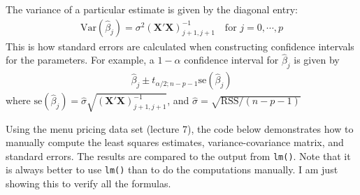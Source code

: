 \documentclass[11pt, fleqn]{article}\usepackage[]{graphicx}\usepackage[]{color}
\newcommand{\Var}{\textrm{Var}}
\newcommand{\se}{\textrm{se}}
\begin{document}
The variance of a particular estimate is given by the diagonal entry:
\begin{align*}
\Var(\hat{\beta}_{j}) = \sigma^2 (\bm{X'X})^{-1}_{j+1, j+1} 
\quad \text{for } j=0,\cdots,p
\end{align*}
This is how standard errors are calculated when constructing confidence intervals for the parameters.  For example, a $1-\alpha$ confidence interval for $\hat{\beta}_j$ is given by
\begin{align*}
\hat{\beta}_j \pm t_{\alpha /2; n-p-1} \se(\hat{\beta}_j)
\end{align*}
where $\se(\hat{\beta}_j) = \hat{\sigma} \sqrt{(\bm{X'X})^{-1}_{j+1,j+1}}$, and $\hat{\sigma} = \sqrt{\text{RSS} / (n-p-1)}$

\clearpage

Using the menu pricing data set (lecture 7), the code below demonstrates how to manually compute the least squares estimates, variance-covariance matrix, and standard errors.  The results are compared to the output from \texttt{lm()}.  Note that it is always better to use \texttt{lm()} than to do the computations manually.  I am just showing this to verify all the formulas.
\end{document}
